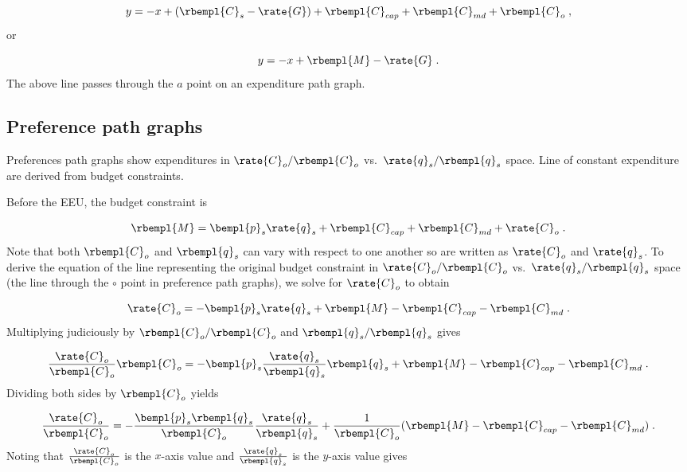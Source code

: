 \begin{equation}
  y = -x + (\rbempl{C}_s - \rate{G}) + \rbempl{C}_{cap} + \rbempl{C}_{md} + \rbempl{C}_o \; ,
\end{equation}
%
or

\begin{equation}
  y = -x + \rbempl{M} - \rate{G}\; .
\end{equation}
%
The above line passes through the $a$ point on an expenditure path graph.


\subsection{Preference path graphs}
\label{sec:prefs_path_graph_details}

Preferences path graphs show expenditures in 
$\rate{C}_o/\rbempl{C}_o$ vs.\ $\rate{q}_s/\rbempl{q}_s$ space.
Line of constant expenditure are derived from budget constraints.

Before the EEU, the budget constraint is

\begin{equation}
  \rbempl{M} = \bempl{p}_s \rate{q}_s + \rbempl{C}_{cap} + \rbempl{C}_{md} + \rate{C}_o \; .
\end{equation}
%
Note that both $\rbempl{C}_o$ and $\rbempl{q}_s$ 
can vary with respect to one another so are written as
$\rate{C}_o$ and $\rate{q}_s$.
To derive the equation of the line representing the original budget constraint 
in $\rate{C}_o/\rbempl{C}_o$ vs.\ $\rate{q}_s/\rbempl{q}_s$ space
(the \circcirc{} line through the $\circ$ point
in preference path graphs), 
we solve for $\rate{C}_o$ to obtain

\begin{equation}
  \rate{C}_o = - \bempl{p}_s \rate{q}_s + \rbempl{M} - \rbempl{C}_{cap} - \rbempl{C}_{md} \; .
\end{equation}
%
Multiplying judiciously by $\rbempl{C}_o/\rbempl{C}_o$ and $\rbempl{q}_s/\rbempl{q}_s$ gives

\begin{equation}
  \frac{\rate{C}_o}{\rbempl{C}_o} \rbempl{C}_o
       = - \bempl{p}_s \frac{\rate{q}_s}{\rbempl{q}_s} \rbempl{q}_s 
         + \rbempl{M} - \rbempl{C}_{cap} - \rbempl{C}_{md} \; .
\end{equation}
%
Dividing both sides by $\rbempl{C}_o$ yields

\begin{equation}
  \frac{\rate{C}_o}{\rbempl{C}_o}
       = - \frac{\bempl{p}_s \rbempl{q}_s}{\rbempl{C}_o} \frac{\rate{q}_s}{\rbempl{q}_s}
         + \frac{1}{\rbempl{C}_o} (\rbempl{M} - \rbempl{C}_{cap} - \rbempl{C}_{md}) \; .
\end{equation}
%
Noting that $\frac{\rate{C}_o}{\rbempl{C}_o}$ is the $x$-axis value and 
$\frac{\rate{q}_s}{\rbempl{q}_s}$ is the $y$-axis value gives

